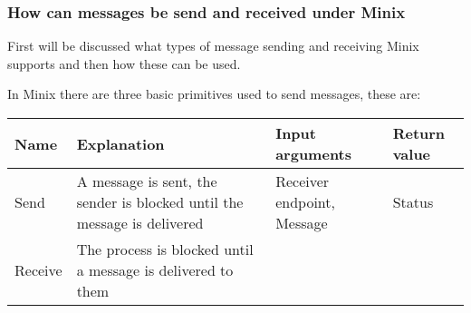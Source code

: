 \hypertarget{how-can-messages-be-send-and-received-under-minix}{%
\subsubsection{How can messages be send and received under
Minix}\label{how-can-messages-be-send-and-received-under-minix}}

First will be discussed what types of message sending and receiving
Minix supports and then how these can be used.

In Minix there are three basic primitives used to send messages, these
are:

\begin{longtable}[]{@{}llll@{}}
\toprule
\begin{minipage}[b]{0.11\columnwidth}\raggedright
Name\strut
\end{minipage} & \begin{minipage}[b]{0.23\columnwidth}\raggedright
Explanation\strut
\end{minipage} & \begin{minipage}[b]{0.30\columnwidth}\raggedright
Input arguments\strut
\end{minipage} & \begin{minipage}[b]{0.25\columnwidth}\raggedright
Return value\strut
\end{minipage}\tabularnewline
\midrule
\endhead
\begin{minipage}[t]{0.11\columnwidth}\raggedright
Send\strut
\end{minipage} & \begin{minipage}[t]{0.23\columnwidth}\raggedright
A message is sent, the sender is blocked until the message is
delivered\strut
\end{minipage} & \begin{minipage}[t]{0.30\columnwidth}\raggedright
Receiver endpoint, Message\strut
\end{minipage} & \begin{minipage}[t]{0.25\columnwidth}\raggedright
Status\strut
\end{minipage}\tabularnewline
\begin{minipage}[t]{0.11\columnwidth}\raggedright
Receive\strut
\end{minipage} & \begin{minipage}[t]{0.23\columnwidth}\raggedright
The process is blocked until a message is delivered to them\strut
\end{minipage} & \begin{minipage}[t]{0.30\columnwidth}\raggedright

\end{minipage}
\end{longtable}
